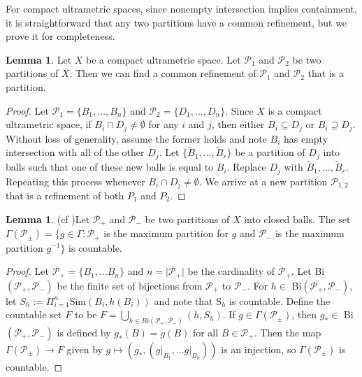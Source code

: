 \documentclass[12pt]{amsart}
\numberwithin{equation}{subsection}
\theoremstyle{definition}
\newtheorem{lemma}[theorem]{Lemma}
\theoremstyle{definition}
\theoremstyle{remark}
\begin{document}
For compact ultrametric spaces, since nonempty intersection implies containment, it is straightforward that any two partitions have a common refinement, but we prove it for completeness. 

\begin{lemma}
    Let $X$ be a compact ultrametric space. Let $\mathcal P_1$ and $\mathcal P_2$ be two partitions of $X$. Then we can find a common refinement of $\mathcal P_1$ and $\mathcal P_2$ that is a partition. 
\end{lemma}

\begin{proof}
    Let $\mathcal P_1 = \{B_1, \dots, B_n \}$ and $\mathcal P_2 = \{D_1, \dots, D_n\}$. Since $X$ is a compact ultrametric space, if $B_i \cap D_j \neq \emptyset$ for any $i$ and $j$, then either $B_i \subseteq D_j$ or $B_i \supseteq D_j$. Without loss of generality, assume the former holds and note $B_i$ has empty intersection with all of the other $D_j$. Let $\{\tilde B_1, \dots , \tilde B_r\}$ be a partition of $D_j$ into balls such that one of these new balls is equal to $B_i$. Replace $D_j$ with $\tilde B_1, \dots , \tilde B_r$. Repeating this process whenever $B_i \cap D_j \neq \emptyset$. We arrive at a new partition $\mathcal P_{1,2}$ that is a refinement of both $P_1$ and $P_2$. 
    
\end{proof}


\begin{lemma}(cf \cite[Lemma 3.10]{hughes2009})\label{lemma:partition}
    Let $\mathscr{P}_+$ and $\mathscr{P}_-$ be two partitions of $X$ into closed balls. The set $\Gamma(\mathscr{P}_{\pm}) = \{ g \in \Gamma : \mathscr{P}_+$ is the maximum partition for $g$ and $\mathscr{P}_-$ is the maximum partition $g^{-1}\}$ is countable.
\end{lemma}
 

 \begin{proof}
     Let $\mathscr{P}_+ = \{B_1, \dots B_n \}$ and $n = \vert \mathscr{P}_+\vert $ be the cardinality of $\mathscr{P}_+$. Let Bi$(\mathscr{P}_+,\mathscr{P}_-)$ be the finite set of bijections from $\mathscr{P}_+$ to $\mathscr{P}_-$. For $h \in$ Bi$(\mathscr{P}_+, \mathscr{P}_-)$, let $S_h := \Pi_{i=1}^n \text{Sim}(B_i,h(B_i))$ and note that S$_h$ is countable. Define the countable set $F$ to be $F = \bigcup_{h \in Bi(\mathscr{P}_+,\mathscr{P}_-)}(h, S_h)$. If $g \in \Gamma(\mathscr{P}_{\pm})$, then $g_* \in$ Bi$(\mathscr{P}_+,\mathscr{P}_-)$ is defined by $g_*(B) = g(B)$ for all $B \in \mathscr{P}_+$. Then the map $\Gamma (\mathscr{P}_{\pm}) \rightarrow F$ given by $g \mapsto (g_*,(g\vert_{B_1}, \dots g\vert_{B_n}))$ is an injection, so $\Gamma (\mathscr{P}_{\pm})$ is countable.   
 \end{proof}
\end{document}
